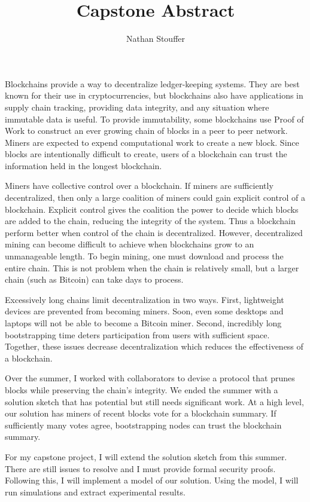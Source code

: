 \documentclass[11pt]{article}
\title{Capstone Abstract}
\author{Nathan Stouffer}
\date{}
\begin{document}
    \maketitle

    Blockchains provide a way to decentralize ledger-keeping systems.
    They are best known for their use in cryptocurrencies, but blockchains also have applications in supply chain tracking, providing data integrity, and any situation where immutable data is useful.
    To provide immutability, some blockchains use Proof of Work to construct an ever growing chain of blocks in a peer to peer network.
    Miners are expected to expend computational work to create a new block.
    Since blocks are intentionally difficult to create, users of a blockchain can trust the information held in the longest blockchain.

    Miners have collective control over a blockchain.
    If miners are sufficiently decentralized, then only a large coalition of miners could  gain explicit control of a blockchain.
    Explicit control gives the coalition the power to decide which blocks are added to the chain, reducing the integrity of the system.
    Thus a blockchain perform better when control of the chain is decentralized.
    However, decentralized mining can become difficult to achieve when blockchains grow to an unmanageable length.
    To begin mining, one must download and process the entire chain.
    This is not problem when the chain is relatively small, but a larger chain (such as Bitcoin) can take days to process.

    Excessively long chains limit decentralization in two ways.
    First, lightweight devices are prevented from becoming miners.
    Soon, even some desktops and laptops will not be able to become a Bitcoin miner.
    Second, incredibly long bootstrapping time deters participation from users with sufficient space.
    Together, these issues decrease decentralization which reduces the effectiveness of a blockchain.

    Over the summer, I worked with collaborators to devise a protocol that prunes blocks while preserving the chain's integrity.
    We ended the summer with a solution sketch that has potential but still needs significant work.
    At a high level, our solution has miners of recent blocks vote for a blockchain summary.
    If sufficiently many votes agree, bootstrapping nodes can trust the blockchain summary.


    For my capstone project, I will extend the solution sketch from this summer.
    There are still issues to resolve and I must provide formal security proofs.
    Following this, I will implement a model of our solution.
    Using the model, I will run simulations and extract experimental results.
\end{document}
